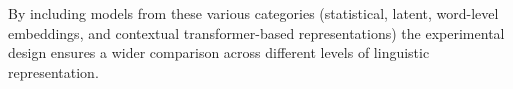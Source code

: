 \documentclass[\myFontSize,a4paper,oneside,hidelinks]{article}
\begin{document}
\begin{enumerate}
%

\end{enumerate}
%
By including models from these various categories (statistical, latent, word-level embeddings, and contextual transformer-based representations) the experimental design ensures a wider comparison across different levels of linguistic representation.
%
\end{document}

